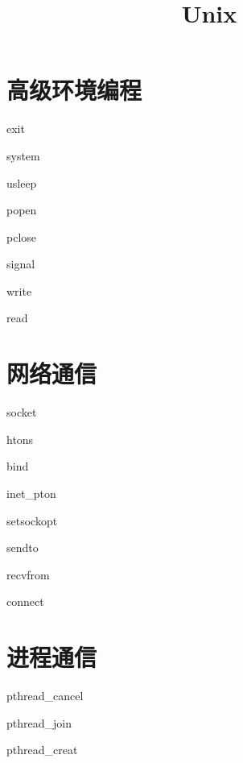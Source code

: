 \documentclass{article} %
\begin{document}

\begin{titlepage}           %
\title{Unix} %
\maketitle                  %
\end{titlepage}
\tableofcontents        %
\newpage                %

\section{高级环境编程}      %
    exit\par
    system\par
    usleep\par
    popen\par
    pclose\par
    signal\par
    write\par
    read\par

\section{网络通信}
    socket\par
    htons\par
    bind\par
    inet_pton\par
    setsockopt\par
    sendto\par
    recvfrom\par
    connect\par
\section{进程通信}
    pthread_cancel\par
    pthread_join\par
    pthread_creat\par
\end{document}
